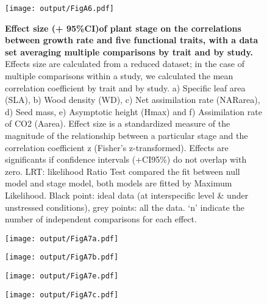 \documentclass[a4paper]{article}\usepackage[]{graphicx}\usepackage[]{color}
\begin{document}
\begin{appendices}
\begin{figure}[htbp]
\centering
\texttt{[image: output/FigA6.pdf]}
\caption{\textbf{Effect size (+ 95\%CI)of plant stage on the
correlations between growth rate and five functional traits, with a data set averaging multiple comparisons by trait and by study.} Effects size are calculated from a reduced dataset; in the case of multiple comparisons within a study, we calculated the mean correlation coefficient by trait and by study. a) Specific leaf area (SLA), b) Wood density (WD), c) Net assimilation rate (NARarea), d) Seed mass, e) Asymptotic height (Hmax) and f) Assimilation rate of CO2 (Aarea). Effect size is a standardized measure of the magnitude of the relationship between a particular stage and the correlation coefficient z (Fisher's z-transformed). Effects are significants if confidence intervals (+CI95\%) do not overlap with zero. LRT: likelihood Ratio Test compared the fit between null model and stage model, both models are fitted by Maximum Likelihood. Black point: ideal data (at interspecific level \& under unstressed conditions), grey points: all the data. `n' indicate the number of independent comparisons for each effect.}
\label{FigA6}
\end{figure}


\begin{figure}[htbp]
\centering
\texttt{[image: output/FigA7a.pdf]}
\end{figure}

\begin{figure}[htbp]
\centering
\texttt{[image: output/FigA7b.pdf]}
\end{figure}

\begin{figure}[htbp]
\centering
\texttt{[image: output/FigA7e.pdf]}
\end{figure}

\begin{figure}[htbp]
\centering
\texttt{[image: output/FigA7c.pdf]}
\end{figure}


\end{appendices}
\end{document}
